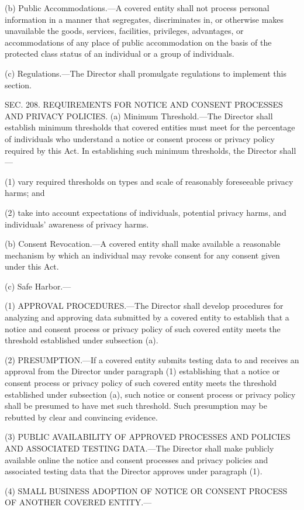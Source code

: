 (b) Public Accommodations.—A covered entity shall not process personal information in a manner that segregates, discriminates in, or otherwise makes unavailable the goods, services, facilities, privileges, advantages, or accommodations of any place of public accommodation on the basis of the protected class status of an individual or a group of individuals.

(c) Regulations.—The Director shall promulgate regulations to implement this section.


SEC. 208. REQUIREMENTS FOR NOTICE AND CONSENT PROCESSES AND PRIVACY POLICIES.
(a) Minimum Threshold.—The Director shall establish minimum thresholds that covered entities must meet for the percentage of individuals who understand a notice or consent process or privacy policy required by this Act. In establishing such minimum thresholds, the Director shall—

(1) vary required thresholds on types and scale of reasonably foreseeable privacy harms; and

(2) take into account expectations of individuals, potential privacy harms, and individuals’ awareness of privacy harms.

(b) Consent Revocation.—A covered entity shall make available a reasonable mechanism by which an individual may revoke consent for any consent given under this Act.

(c) Safe Harbor.—

(1) APPROVAL PROCEDURES.—The Director shall develop procedures for analyzing and approving data submitted by a covered entity to establish that a notice and consent process or privacy policy of such covered entity meets the threshold established under subsection (a).

(2) PRESUMPTION.—If a covered entity submits testing data to and receives an approval from the Director under paragraph (1) establishing that a notice or consent process or privacy policy of such covered entity meets the threshold established under subsection (a), such notice or consent process or privacy policy shall be presumed to have met such threshold. Such presumption may be rebutted by clear and convincing evidence.

(3) PUBLIC AVAILABILITY OF APPROVED PROCESSES AND POLICIES AND ASSOCIATED TESTING DATA.—The Director shall make publicly available online the notice and consent processes and privacy policies and associated testing data that the Director approves under paragraph (1).

(4) SMALL BUSINESS ADOPTION OF NOTICE OR CONSENT PROCESS OF ANOTHER COVERED ENTITY.—

